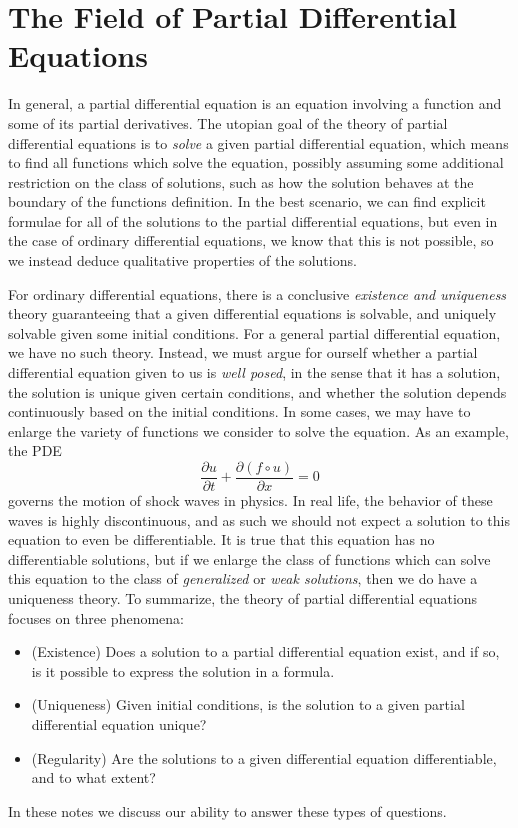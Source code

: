 \section{The Field of Partial Differential Equations}

In general, a partial differential equation is an equation involving a function and some of its partial derivatives. The utopian goal of the theory of partial differential equations is to {\it solve} a given partial differential equation, which means to find all functions which solve the equation, possibly assuming some additional restriction on the class of solutions, such as how the solution behaves at the boundary of the functions definition. In the best scenario, we can find explicit formulae for all of the solutions to the partial differential equations, but even in the case of ordinary differential equations, we know that this is not possible, so we instead deduce qualitative properties of the solutions.

For ordinary differential equations, there is a conclusive {\it existence and uniqueness} theory guaranteeing that a given differential equations is solvable, and uniquely solvable given some initial conditions. For a general partial differential equation, we have no such theory. Instead, we must argue for ourself whether a partial differential equation given to us is {\it well posed}, in the sense that it has a solution, the solution is unique given certain conditions, and whether the solution depends continuously based on the initial conditions. In some cases, we may have to enlarge the variety of functions we consider to solve the equation. As an example, the PDE
%
\[ \frac{\partial u}{\partial t} + \frac{\partial (f \circ u)}{\partial x} = 0 \]
%
governs the motion of shock waves in physics. In real life, the behavior of these waves is highly discontinuous, and as such we should not expect a solution to this equation to even be differentiable. It is true that this equation has no differentiable solutions, but if we enlarge the class of functions which can solve this equation to the class of {\it generalized} or {\it weak solutions}, then we do have a uniqueness theory. To summarize, the theory of partial differential equations focuses on three phenomena:
%
\begin{itemize}
    \item (Existence) Does a solution to a partial differential equation exist, and if so, is it possible to express the solution in a formula.

    \item (Uniqueness) Given initial conditions, is the solution to a given partial differential equation unique?

    \item (Regularity) Are the solutions to a given differential equation differentiable, and to what extent?
\end{itemize}
%
In these notes we discuss our ability to answer these types of questions.



